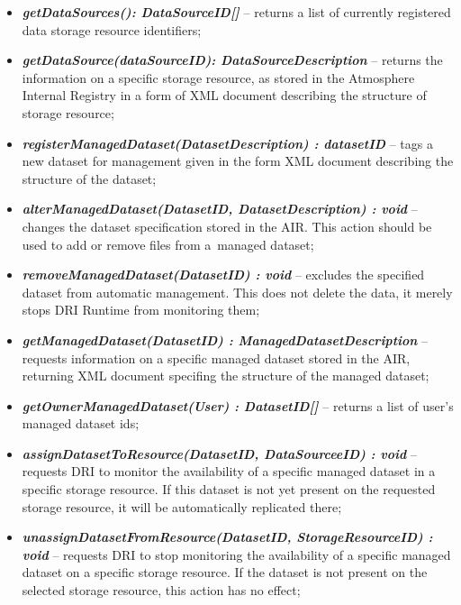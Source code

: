 \begin{itemize}
	\item \textbf{\textit{getDataSources(): DataSourceID[]}} --
	returns a list of currently registered data storage resource identifiers;
	
	\item \textbf{\textit{getDataSource(dataSourceID):
	DataSourceDescription}} -- returns the information on a specific storage
	resource, as stored in the Atmosphere Internal Registry in a form of XML
	document describing the structure of storage resource;
	
	\item \textbf{\textit{registerManagedDataset(DatasetDescription) :
	datasetID}} -- tags a new dataset for management given in
	the form XML document describing the structure of the dataset;
	
	\item \textbf{\textit{alterManagedDataset(DatasetID, DatasetDescription) :
	void}} -- changes the dataset specification stored in the AIR. This action
	should be used to add or remove files from a~managed dataset;
	
	\item \textbf{\textit{removeManagedDataset(DatasetID) : void}} -- excludes
	the specified dataset from automatic management. This does not delete the
	data, it merely stops DRI Runtime from monitoring them;
	
	\item \textbf{\textit{getManagedDataset(DatasetID) :
	ManagedDatasetDescription}} -- requests information on a specific managed
	dataset stored in the AIR, returning XML document specifing the structure
	of the managed dataset;
	
	\item \textbf{\textit{getOwnerManagedDataset(User) : DatasetID[]}} --
	returns a list of user's managed dataset ids;
	
	\item \textbf{\textit{assignDatasetToResource(DatasetID, 
	DataSourceeID) : void}} -- requests DRI to monitor the availability of
	a specific managed dataset in a specific storage resource. If this dataset
	is not yet present on the requested storage resource, it will be
	automatically replicated there;
	
	\item \textbf{\textit{unassignDatasetFromResource(DatasetID, 
	StorageResourceID) : void}} -- requests DRI to stop monitoring the 
	availability of a specific managed dataset on a specific storage resource.
	If the dataset is not present on the selected storage resource, this action
	has no effect;
	

\end{itemize}
